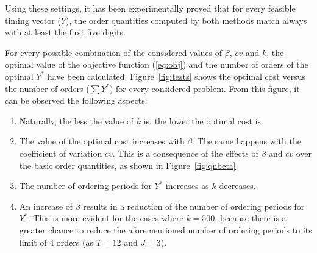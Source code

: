 {Using these settings, it has been experimentally proved that for every feasible timing vector  ($Y$), the order quantities computed by both methods match always with at least the first five digits. %

For every possible combination of the considered values of $\beta$, $cv$ and $k$, the optimal value of the objective function (\ref{eq:obj}) and the number of orders of the optimal $Y^*$ have been calculated. Figure~\ref{fig:tests} shows the optimal cost  versus the number of orders ($\sum Y^*$) for every considered problem. From this figure, it can be observed the following aspects:
\begin{enumerate}
	\item Naturally, the less the value of $k$ is, the lower the optimal cost is.
	\item The value of the optimal cost increases with $\beta$. The same happens with the coefficient of variation $cv$. This is a consequence of the effects of $\beta$ and $cv$ over the basic order quantities, as shown in  Figure~\ref{fig:qnbeta}.
	\item The number of ordering periods  for $Y^*$ increases as $k$ decreases.
	\item An increase of $\beta$ results in a reduction of the number of ordering periods  for $Y^*$. This is more evident for the cases where $k=500$, because there is a greater chance to reduce the aforementioned number of ordering periods to its limit of 4 orders (as $T=12$ and $J=3$).
\end{enumerate}


}
